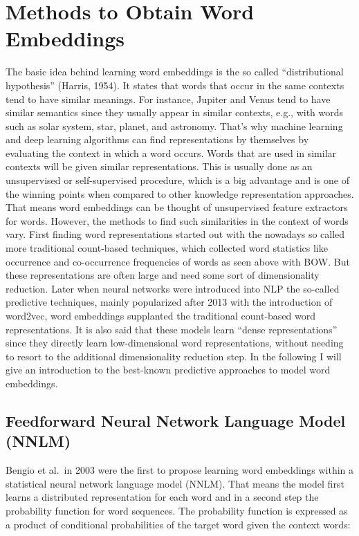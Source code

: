 \documentclass[]{krantz}
\begin{document}
\hypertarget{methods-to-obtain-word-embeddings}{%
\section{Methods to Obtain Word Embeddings}\label{methods-to-obtain-word-embeddings}}

The basic idea behind learning word embeddings is the so called ``distributional hypothesis'' (Harris, 1954). It states that words that occur in the same contexts tend to have similar meanings. For instance, Jupiter and Venus tend to have similar semantics since they usually appear in similar contexts, e.g., with words such as solar system, star, planet, and astronomy. That's why machine learning and deep learning algorithms can find representations by themselves by evaluating the context in which a word occurs. Words that are used in similar contexts will be given similar representations. This is usually done as an unsupervised or self-supervised procedure, which is a big advantage and is one of the winning points when compared to other knowledge representation approaches. That means word embeddings can be thought of unsupervised feature extractors for words. However, the methods to find such similarities in the context of words vary. First finding word representations started out with the nowadays so called more traditional count-based techniques, which collected word statistics like occurrence and co-occurrence frequencies of words as seen above with BOW. But these representations are often large and need some sort of dimensionality reduction. Later when neural networks were introduced into NLP the so-called predictive techniques, mainly popularized after 2013 with the introduction of word2vec, word embeddings supplanted the traditional count-based word representations. It is also said that these models learn ``dense representations'' since they directly learn low-dimensional word representations, without needing to resort to the additional dimensionality reduction step. In the following I will give an introduction to the best-known predictive approaches to model word embeddings.

\hypertarget{feedforward-neural-network-language-model-nnlm}{%
\subsection{Feedforward Neural Network Language Model (NNLM)}\label{feedforward-neural-network-language-model-nnlm}}

Bengio et al.~in 2003 were the first to propose learning word embeddings within a statistical neural network language model (NNLM). That means the model first learns a distributed representation for each word and in a second step the probability function for word sequences. The probability function is expressed as a product of conditional probabilities of the target word given the context words:
\end{document}
